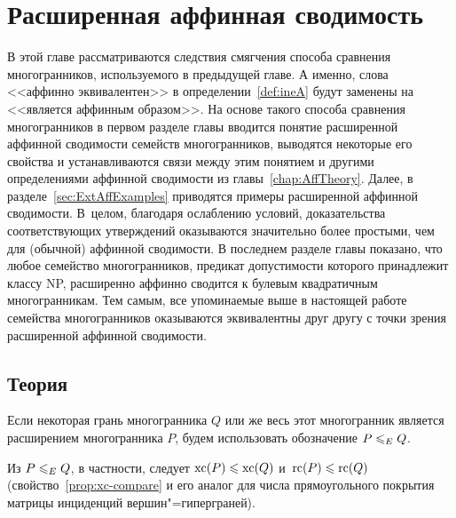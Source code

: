 
%
%

\chapter{Расширенная аффинная сводимость}
\label{chap:ExtAff}

В этой главе рассматриваются следствия смягчения способа сравнения многогранников, используемого в предыдущей главе.
А именно, слова <<аффинно эквивалентен>> в определении~\ref{def:ineA} будут заменены на <<является аффинным образом>>. 
На основе такого способа сравнения многогранников в первом разделе главы вводится понятие расширенной аффинной сводимости семейств многогранников, выводятся некоторые его свойства и устанавливаются связи между этим понятием и другими определениями аффинной сводимости из главы~\ref{chap:AffTheory}.
Далее, в разделе~\ref{sec:ExtAffExamples} приводятся примеры расширенной аффинной сводимости. В~целом, благодаря ослаблению условий, доказательства соответствующих утверждений оказываются значительно более простыми, чем для (обычной) аффинной сводимости.
В последнем разделе главы показано, что любое семейство многогранников, предикат допустимости которого принадлежит классу NP, расширенно аффинно сводится к булевым квадратичным многогранникам.
Тем самым, все упоминаемые выше в настоящей работе семейства многогранников оказываются эквивалентны друг другу с точки зрения расширенной аффинной сводимости.

\section{Теория}
\label{sec:ExtensionTheory}

\begin{definition}\label{def:ineE}
	Если некоторая грань многогранника $Q$ или же весь этот многогранник является расширением многогранника $P$, 
	будем использовать обозначение $P \leqslant_E Q$.
\end{definition}

Из $P \leqslant_E Q$, в частности, следует $\operatorname{xc}(P) \leqslant \operatorname{xc}(Q)$ и~$\operatorname{rc}(P) \leqslant \operatorname{rc}(Q)$
(свойство~\ref{prop:xc-compare} и его аналог для числа прямоугольного покрытия матрицы инциденций вершин"=гиперграней). 

